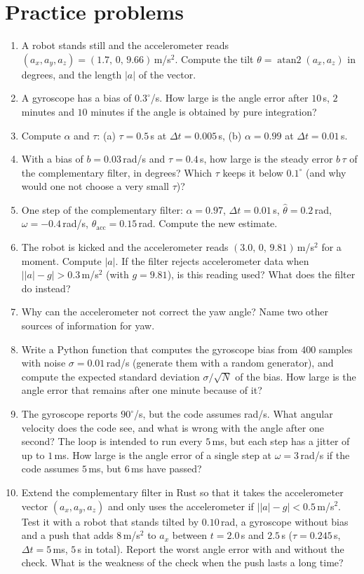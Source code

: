\section*{Practice problems}
\begin{enumerate}[label=\textbf{\thechapter.\arabic*}]
  \item A robot stands still and the accelerometer reads $(a_x,a_y,a_z)=(1.7,\,0,\,9.66)$\,m/s$^2$. Compute the tilt $\theta=\operatorname{atan2}(a_x,a_z)$ in degrees, and the length $|a|$ of the vector.
  \item A gyroscope has a bias of $0.3^{\circ}$/s. How large is the angle error after $10$\,s, $2$ minutes and $10$ minutes if the angle is obtained by pure integration?
  \item Compute $\alpha$ and $\tau$: (a) $\tau=0.5$\,s at $\Delta t=0.005$\,s, (b) $\alpha=0.99$ at $\Delta t=0.01$\,s.
  \item With a bias of $b=0.03$\,rad/s and $\tau=0.4$\,s, how large is the steady error $b\,\tau$ of the complementary filter, in degrees? Which $\tau$ keeps it below $0.1^{\circ}$ (and why would one not choose a very small $\tau$)?
  \item One step of the complementary filter: $\alpha=0.97$, $\Delta t=0.01$\,s, $\hat\theta=0.2$\,rad, $\omega=-0.4$\,rad/s, $\theta_{\text{acc}}=0.15$\,rad. Compute the new estimate.
  \item The robot is kicked and the accelerometer reads $(3.0,\,0,\,9.81)$\,m/s$^2$ for a moment. Compute $|a|$. If the filter rejects accelerometer data when $\bigl||a|-g\bigr|>0.3$\,m/s$^2$ (with $g=9.81$), is this reading used? What does the filter do instead?
  \item Why can the accelerometer not correct the yaw angle? Name two other sources of information for yaw.
  \item Write a Python function that computes the gyroscope bias from $400$ samples with noise $\sigma=0.01$\,rad/s (generate them with a random generator), and compute the expected standard deviation $\sigma/\sqrt N$ of the bias. How large is the angle error that remains after one minute because of it?
  \item The gyroscope reports $90^{\circ}$/s, but the code assumes rad/s. What angular velocity does the code see, and what is wrong with the angle after one second? The loop is intended to run every $5$\,ms, but each step has a jitter of up to $1$\,ms. How large is the angle error of a single step at $\omega=3$\,rad/s if the code assumes $5$\,ms, but $6$\,ms have passed?
  \item[\textbf{\thechapter.10}$\star$] Extend the complementary filter in Rust so that it takes the accelerometer vector $(a_x,a_y,a_z)$ and only uses the accelerometer if $\bigl||a|-g\bigr|<0.5$\,m/s$^2$. Test it with a robot that stands tilted by $0.10$\,rad, a gyroscope without bias and a push that adds $8$\,m/s$^2$ to $a_x$ between $t=2.0$\,s and $2.5$\,s ($\tau=0.245$\,s, $\Delta t=5$\,ms, $5$\,s in total). Report the worst angle error with and without the check. What is the weakness of the check when the push lasts a long time?
\end{enumerate}

